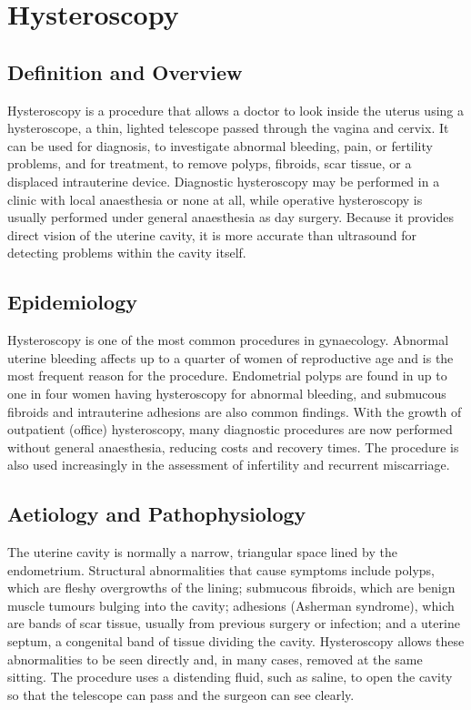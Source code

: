 \chapter{Hysteroscopy}

\section*{Definition and Overview}
Hysteroscopy is a procedure that allows a doctor to look inside the uterus using a hysteroscope, a thin, lighted telescope passed through the vagina and cervix. It can be used for diagnosis, to investigate abnormal bleeding, pain, or fertility problems, and for treatment, to remove polyps, fibroids, scar tissue, or a displaced intrauterine device. Diagnostic hysteroscopy may be performed in a clinic with local anaesthesia or none at all, while operative hysteroscopy is usually performed under general anaesthesia as day surgery. Because it provides direct vision of the uterine cavity, it is more accurate than ultrasound for detecting problems within the cavity itself.

\section*{Epidemiology}
Hysteroscopy is one of the most common procedures in gynaecology. Abnormal uterine bleeding affects up to a quarter of women of reproductive age and is the most frequent reason for the procedure. Endometrial polyps are found in up to one in four women having hysteroscopy for abnormal bleeding, and submucous fibroids and intrauterine adhesions are also common findings. With the growth of outpatient (office) hysteroscopy, many diagnostic procedures are now performed without general anaesthesia, reducing costs and recovery times. The procedure is also used increasingly in the assessment of infertility and recurrent miscarriage.

\section*{Aetiology and Pathophysiology}
The uterine cavity is normally a narrow, triangular space lined by the endometrium. Structural abnormalities that cause symptoms include polyps, which are fleshy overgrowths of the lining; submucous fibroids, which are benign muscle tumours bulging into the cavity; adhesions (Asherman syndrome), which are bands of scar tissue, usually from previous surgery or infection; and a uterine septum, a congenital band of tissue dividing the cavity. Hysteroscopy allows these abnormalities to be seen directly and, in many cases, removed at the same sitting. The procedure uses a distending fluid, such as saline, to open the cavity so that the telescope can pass and the surgeon can see clearly.

